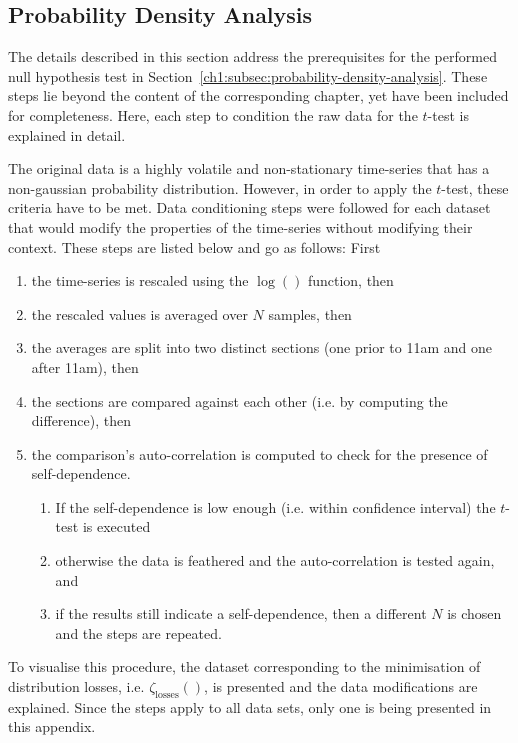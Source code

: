 \subsection{Probability Density Analysis}
\label{appx-a:ch1:probability-density-analysis}

The details described in this section address the prerequisites for the performed null hypothesis test in Section~\ref{ch1:subsec:probability-density-analysis}.
These steps lie beyond the content of the corresponding chapter, yet have been included for completeness.
Here, each step to condition the raw data for the $t$-test is explained in detail.

The original data is a highly volatile and non-stationary time-series that has a non-gaussian probability distribution.
However, in order to apply the $t$-test, these criteria have to be met.
Data conditioning steps were followed for each dataset that would modify the properties of the time-series without modifying their context.
These steps are listed below and go as follows: First

\begin{enumerate}
	\item the time-series is rescaled using the $\log()$ function, then
	\item the rescaled values is averaged over $N$ samples, then
	\item the averages are split into two distinct sections (one prior to 11am and one after 11am), then
	\item the sections are compared against each other (i.e. by computing the difference), then
	\item the comparison's auto-correlation is computed to check for the presence of self-dependence.
	\begin{enumerate}
		\item If the self-dependence is low enough (i.e. within confidence interval) the $t$-test is executed
		\item otherwise the data is feathered and the auto-correlation is tested again, and
		\item if the results still indicate a self-dependence, then a different $N$ is chosen and the steps are repeated.
	\end{enumerate}
\end{enumerate}

To visualise this procedure, the dataset corresponding to the minimisation of distribution losses, i.e. $\zeta_\text{losses}()$, is presented and the data modifications are explained.
Since the steps apply to all data sets, only one is being presented in this appendix.


